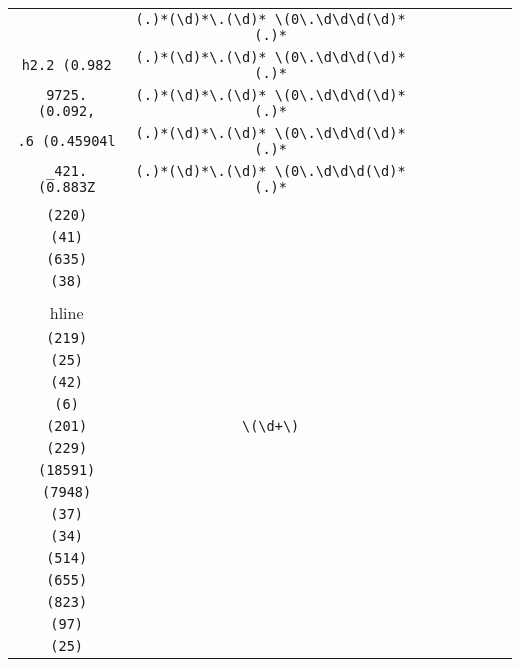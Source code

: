 \begin{longtable}{cccccccc}
\begin{tabular}{ll}
    \verb|1. (0.150441838E1| & \verb|(.)*(\d)*\.(\d)* \(0\.\d\d\d(\d)*(.)*|\\
\verb|h2.2 (0.982| & \verb|(.)*(\d)*\.(\d)* \(0\.\d\d\d(\d)*(.)*|\\
\verb|9725. (0.092,| & \verb|(.)*(\d)*\.(\d)* \(0\.\d\d\d(\d)*(.)*|\\
\verb|.6 (0.45904l| & \verb|(.)*(\d)*\.(\d)* \(0\.\d\d\d(\d)*(.)*|\\
\verb|_421. (0.883Z| & \verb|(.)*(\d)*\.(\d)* \(0\.\d\d\d(\d)*(.)*|
\end{tabular}
\\\midrule 
\begin{tabular}{l}
    \verb|(210)|\\
\verb|(220)|\\
\verb|(41)|\\
\verb|(635)|\\
\verb|(38)|\\
\\hline\\
\verb|(219)|\\
\verb|(25)|\\
\verb|(42)|\\
\verb|(6)|\\
\verb|(201)|
\end{tabular}

&
\verb|\(\d+\)|
&

\begin{tabular}{l}
    \verb|\(\d\d(\d)*\)|\\
\verb|(229)|\\
\verb|(18591)|\\
\verb|(7948)|\\
\verb|(37)|\\
\verb|(34)|
\end{tabular}

&

\begin{tabular}{l}
    \verb|\(\d\d(\d)*\)|\\
\verb|(514)|\\
\verb|(655)|\\
\verb|(823)|\\
\verb|(97)|\\
\verb|(25)|
\end{tabular}

&


\end{longtable}
